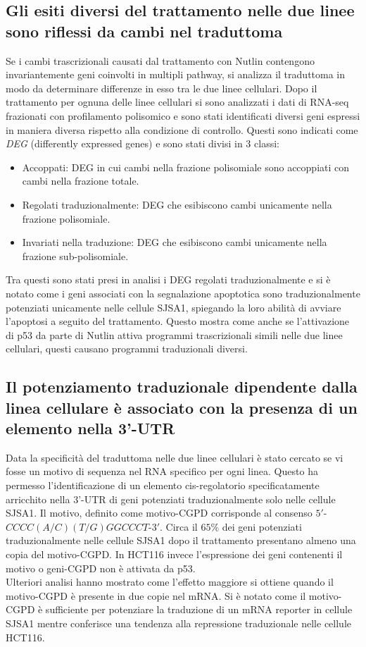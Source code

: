   \subsection{Gli esiti diversi del trattamento nelle due linee sono riflessi da cambi nel traduttoma}
  Se i cambi trascrizionali causati dal trattamento con Nutlin contengono invariantemente geni coinvolti in multipli pathway, si analizza il traduttoma in modo da determinare differenze in esso tra le due linee cellulari.
  Dopo il trattamento per ognuna delle linee cellulari si sono analizzati i dati di RNA-seq frazionati con profilamento polisomico e sono stati identificati diversi geni espressi in maniera diversa rispetto alla condizione di controllo.
  Questi sono indicati come \emph{DEG} (differently expressed genes) e sono stati divisi in $3$ classi:
  \begin{itemize}
    \item Accoppati: DEG in cui cambi nella frazione polisomiale sono accoppiati con cambi nella frazione totale.
    \item Regolati traduzionalmente: DEG che esibiscono cambi unicamente nella frazione polisomiale.
    \item Invariati nella traduzione: DEG che esibiscono cambi unicamente nella frazione sub-polisomiale.
  \end{itemize}
  Tra questi sono stati presi in analisi i DEG regolati traduzionalmente e si \`e notato come i geni associati con la segnalazione apoptotica sono traduzionalmente potenziati unicamente nelle cellule SJSA1, spiegando la loro abilit\`a di avviare l'apoptosi a seguito del trattamento.
  Questo mostra come anche se l'attivazione di p53 da parte di Nutlin attiva programmi trascrizionali simili nelle due linee cellulari, questi causano programmi traduzionali diversi.

  \subsection{Il potenziamento traduzionale dipendente dalla linea cellulare \`e associato con la presenza di un elemento nella 3'-UTR}
  \label{subsec:cgpd}
  Data la specificit\`a del traduttoma nelle due linee cellulari \`e stato cercato se vi fosse un motivo di sequenza nel RNA specifico per ogni linea.
  Questo ha permesso l'identificazione di un elemento cis-regolatorio specificatamente arricchito nella 3'-UTR di geni potenziati traduzionalmente solo nelle cellule SJSA1.
  Il motivo, definito come motivo-CGPD corrisponde al consenso $5'$-$CCCC(A/C)(T/G)GGCCCT$-$3'$.
  Circa il $65\%$ dei geni potenziati traduzionalmente nelle cellule SJSA1 dopo il trattamento presentano almeno una copia del motivo-CGPD.
  In HCT116 invece l'espressione dei geni contenenti il motivo o geni-CGPD non \`e attivata da p53.\\
  Ulteriori analisi hanno mostrato come l'effetto maggiore si ottiene quando il motivo-CGPD \`e presente in due copie nel mRNA.
  Si \`e notato come il motivo-CGPD \`e sufficiente per potenziare la traduzione di un mRNA reporter in cellule SJSA1 mentre conferisce una tendenza alla repressione traduzionale nelle cellule HCT116.

